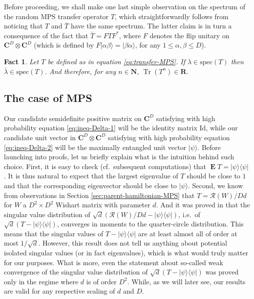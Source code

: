 \documentclass{amsart}
\newtheorem{fact}[theorem]{Fact}
\newcommand{\N}{\mathbf{N}}
\newcommand{\R}{\mathbf{R}}
\newcommand{\C}{\mathbf{C}}
\renewcommand{\leq}{\leqslant}
\newcommand{\Id}{\mathrm{Id}}
\DeclareMathOperator{\Tr}{Tr}
\DeclareMathOperator{\E}{\mathbf{E}}
\newcommand{\ketbra}[2]{| #1 \rangle\!\langle #2 |}
\newcommand{\ket}[1]{| #1 \rangle}
\begin{document}
Before proceeding, we shall make one last simple observation on the spectrum of the random MPS transfer operator $T$, which straightforwardly follows from noticing that $T$ and $\bar{T}$ have the same spectrum. The latter claim is in turn a consequence of the fact that $\bar{T}=FTF^*$, where $F$ denotes the flip unitary on $\C^D\otimes\C^D$ (which is defined by $F\ket{\alpha\beta}=\ket{\beta\alpha}$, for any $1\leq \alpha,\beta \leq D$).

\begin{fact} \label{fact:real-trace}
    Let $T$ be defined as in equation \eqref{eq:transfer-MPS}. If $\lambda\in\mathrm{spec}(T)$ then $\bar{\lambda}\in\mathrm{spec}(T)$. And therefore, for any $n\in\N$, $\Tr(T^n)\in\R$.
\end{fact}

\subsection{The case of MPS} \hfill\par\smallskip
\label{sec:transfer-operator-MPS}

Our candidate semidefinite positive matrix on $\C^D$ satisfying with high probability equation \eqref{eq:ineq-Delta-1} will be the identity matrix $\Id$, while our candidate unit vector in $\C^D\otimes\C^D$ satisfying with high probability equation \eqref{eq:ineq-Delta-2} will be the maximally entangled unit vector $\ket{\psi}$. Before launching into proofs, let us briefly explain what is the intuition behind such choice. First, it is easy to check (cf.~subsequent computations) that $\E T=\ketbra{\psi}{\psi}$. It is thus natural to expect that the largest eigenvalue of $T$ should be close to $1$ and that the corresponding eigenvector should be close to $\ket{\psi}$. Second, we know from observations in Section \ref{sec:parent-hamiltonian-MPS} that $T=\mathcal{R}(W)/Dd$ for $W$ a $D^2\times D^2$ Wishart matrix with parameter $d$. And it was proved in \cite{AN} that the singular value distribution of $\sqrt{d}(\mathcal{R}(W)/Dd-\ketbra{\psi}{\psi})$, i.e.~of $\sqrt{d}(T-\ketbra{\psi}{\psi})$, converges in moments to the quarter-circle distribution. This means that the singular values of $T-\ketbra{\psi}{\psi}$ are at least almost all of order at most $1/\sqrt{d}$. However, this result does not tell us anything about potential isolated singular values (or in fact eigenvalues), which is what would truly matter for our purposes. What is more, even the statement about so-called weak convergence of the singular value distribution of $\sqrt{d}(T-\ketbra{\psi}{\psi})$ was proved only in the regime where $d$ is of order $D^2$. While, as we will later see, our results are valid for any respective scaling of $d$ and $D$.
\end{document}
